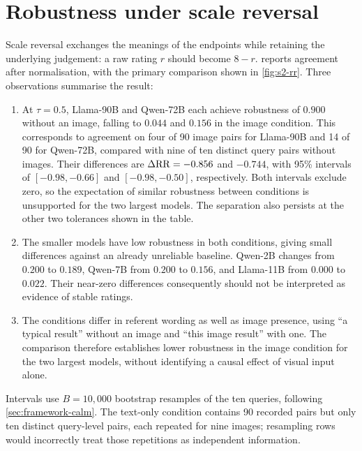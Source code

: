 \section{Robustness under scale reversal}\label{sec:s2-calm}

Scale reversal exchanges the meanings of the endpoints while retaining the
underlying judgement: a raw rating $r$ should become $8-r$.
 reports agreement after normalisation, with the primary
comparison shown in \cref{fig:s2-rr}. Three observations summarise the result:

\begin{enumerate}[leftmargin=*,itemsep=0.5em]
\item At $\tau=0.5$, Llama-90B and Qwen-72B each achieve robustness of
$0.900$ without an image, falling to $0.044$ and $0.156$ in the image
condition. This corresponds to agreement on four of 90 image pairs for
Llama-90B and 14 of 90 for Qwen-72B, compared with nine of ten distinct
query pairs without images. Their differences are $\Delta\mathrm{RR}=-0.856$ and
$-0.744$, with 95\% intervals of $[-0.98,-0.66]$ and $[-0.98,-0.50]$, respectively.
Both intervals exclude zero, so the expectation of similar robustness
between conditions is unsupported for the two largest models. The separation
also persists at the other two tolerances shown in the table.

\item The smaller models have low robustness in both conditions, giving
small differences against an already unreliable baseline. Qwen-2B changes
from $0.200$ to $0.189$, Qwen-7B from $0.200$ to $0.156$, and Llama-11B
from $0.000$ to $0.022$. Their near-zero differences consequently should
not be interpreted as evidence of stable ratings.

\item The conditions differ in referent wording as well as image presence,
using ``a typical result'' without an image and ``this image result''
with one. The comparison therefore establishes lower robustness in the
image condition for the two largest models, without identifying a causal
effect of visual input alone.
\end{enumerate}

Intervals use $B=10{,}000$ bootstrap resamples of the ten queries, following
\cref{sec:framework-calm}. The text-only condition contains 90 recorded
pairs but only ten distinct query-level pairs, each repeated for nine images;
resampling rows would incorrectly treat those repetitions as independent
information.

